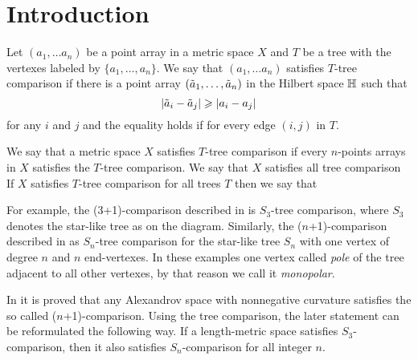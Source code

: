 \section{Introduction}\label{sec:intro}

Let $(a_1,\dots a_n)$ be a point array in a metric space $X$ and $T$ be a 
tree with the vertexes labeled by $\{a_1,\dots,a_n\}$.
We say that $(a_1,\dots a_n)$  satisfies $T$-tree comparison if there is a point array $(\~a_1,\dots, \~a_n)$ in the Hilbert space $\HH$ such that 
\[|\~a_i-\~a_j|\ge|a_i-a_j|\]
for any $i$ and $j$ and the equality holds if for every edge $(i,j)$ in $T$.

We say that a metric space $X$ satisfies $T$-tree comparison if 
every $n$-points arrays in $X$ satisfies the $T$-tree comparison.
We say that  $X$ satisfies all tree comparison
If $X$ satisfies $T$-tree comparison for all trees $T$ then we say that 

\begin{comment}
\begin{wrapfigure}{r}{20 mm}
\begin{tikzpicture}[scale=1,
  thick,main node/.style={circle,draw,font=\sffamily\bfseries,minimum size=3mm}]

  \node[main node] (1) at (5/6,1) {};
  \node[main node] (2) at (0,3/2){};
  \node[main node] (3) at (10/6,3/2){};
  \node[main node] (4) at (5/6,0) {};

  \path[every node/.style={font=\sffamily\small}]
   (1) edge node[above]{}(2)
   (1) edge node[above]{}(3)
   (1) edge node[above]{}(4);
\end{tikzpicture}
\end{wrapfigure}
\end{comment}

For example, the (3+1)-comparison described in \cite{AKP} is $S_3$-tree comparison, where $S_3$ denotes the star-like tree as on the diagram.
Similarly, the ($n$+1)-comparison described in \cite{AKP} as $S_n$-tree comparison for the star-like tree $S_n$ with one vertex of degree $n$ and $n$ end-vertexes.
In these examples one vertex called \emph{pole} of the tree adjacent to all other vertexes,
by that reason we call it \emph{monopolar}.

In \cite[4.1]{AKP} it is proved that any Alexandrov space with nonnegative curvature satisfies the so called  ($n$+1)-comparison.
Using the tree comparison, the later statement can be reformulated the following way.
If a length-metric space satisfies $S_3$-comparison, then it also satisfies $S_n$-comparison for all integer $n$.

